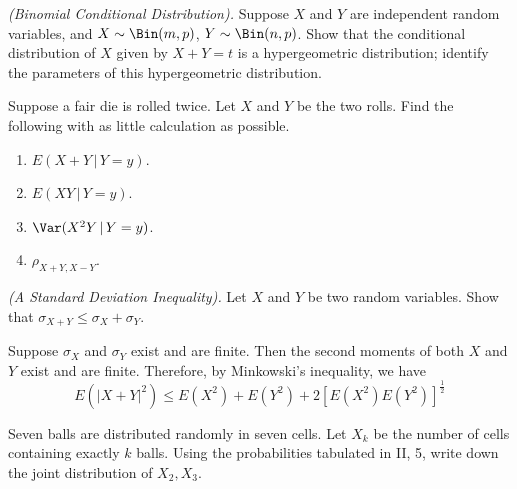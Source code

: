 \begin{problem}[Handout 15, \# 14]
  \emph{(Binomial Conditional Distribution).} Suppose \(X\) and \(Y\) are
  independent random variables, and \(X\sim\Bin(m,p)\),
  \(Y\sim\Bin(n,p)\). Show that the conditional distribution of \(X\) given
  by \(X+Y=t\) is a hypergeometric distribution; identify the parameters of
  this hypergeometric distribution.
\end{problem}
\begin{solution}

\end{solution}
\newpage

\begin{problem}[Handout 15, \# 15]
  Suppose a fair die is rolled twice. Let \(X\) and \(Y\) be the two
  rolls. Find the following with as little calculation as possible.
  \begin{enumerate}[label=(\alph*),noitemsep]
  \item \(E(X+Y\,|\,Y=y)\).
  \item \(E(XY\,|\,Y=y)\).
  \item \(\Var(X^2Y\,|\,Y=y)\).
  \item \(\rho_{X+Y,X-Y}\).
  \end{enumerate}
\end{problem}
\begin{solution}

\end{solution}
\newpage

\begin{problem}[Handout 15, \# 16]
  \emph{(A Standard Deviation Inequality).} Let \(X\) and \(Y\) be two
  random variables. Show that \(\sigma_{X+Y}\leq\sigma_X+\sigma_Y\).
\end{problem}
\begin{solution}
  Suppose \(\sigma_X\) and \(\sigma_Y\) exist and are finite. Then the
  second moments of both \(X\) and \(Y\) exist and are finite. Therefore,
  by Minkowski's inequality, we have
  \[
    E(|X+Y|^2)\leq E(X^2)+E(Y^2)+2{[E(X^2)E(Y^2)]}^\frac{1}{2}
  \]
\end{solution}
\newpage

\begin{problem}[Handout 15, \# 17]
  Seven balls are distributed randomly in seven cells. Let \(X_k\) be
  the number of cells containing exactly \(k\) balls. Using the
  probabilities tabulated in II, 5, write down the joint distribution of
  \(X_2,X_3\).
\end{problem}
\begin{solution}

\end{solution}
\newpage

